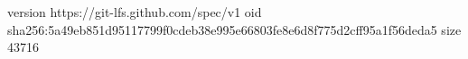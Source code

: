 version https://git-lfs.github.com/spec/v1
oid sha256:5a49eb851d95117799f0cdeb38e995e66803fe8e6d8f775d2cff95a1f56deda5
size 43716

